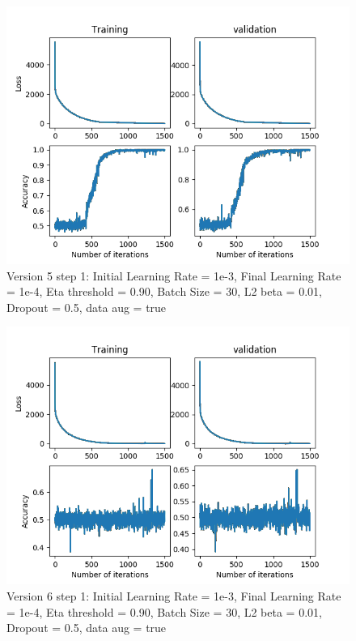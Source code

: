 \documentclass[12pt,reqno]{amsart}
\numberwithin{equation}{section}
\begin{document}
\begin{enumerate}
\begin{figure}[H]
\centering
\includegraphics[scale=0.6]{data_liquid5_version5_step1}
\caption{Version 5 step 1: Initial Learning Rate = 1e-3, Final Learning Rate = 1e-4, Eta threshold = 0.90, Batch Size = 30, L2 beta = 0.01, Dropout = 0.5, data aug = true}
\end{figure}

\begin{figure}[H]
\centering
\includegraphics[scale=0.6]{data_liquid5_version6_step1}
\caption{Version 6 step 1: Initial Learning Rate = 1e-3, Final Learning Rate = 1e-4, Eta threshold = 0.90, Batch Size = 30, L2 beta = 0.01, Dropout = 0.5, data aug = true}
\end{figure}


\end{enumerate}
\end{document}

